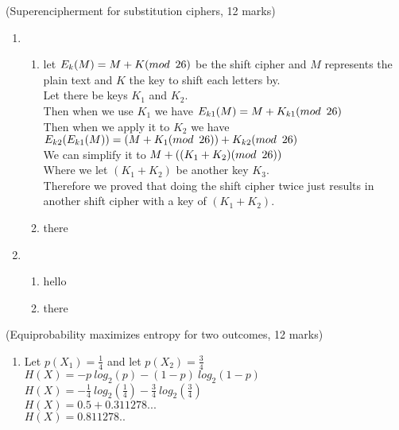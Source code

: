\documentclass{assignment}
\begin{document}
\begin{problemlist}
\pbitem (Superencipherment for substitution ciphers, 12 marks)
\begin{problem}
\begin{answer}
\begin{enumerate}[label=(\alph*)]
	\item	\begin{enumerate}[label=(\roman*)]
			\item let $ E_k(M) = M + K (mod \hspace{.5em} 26) $ be the shift cipher and $M$ represents the plain text 
				  and $K$ the key to shift each letters by. \\
				  Let there be keys $K_1$ and $K_2$. \\
				  Then when we use $K_1$ we have $E_{k1}(M) =  M + K_{k1} (mod \hspace{.5em} 26) $ \\
				  Then when we apply it to $K_2$ we have $E_{k2}(E_{k1}(M)) = (M + K_{1} (mod \hspace{.5em} 26)) + K_{k2} (mod \hspace{.5em} 26) $ \\
				  We can simplify it to $M + ((K_{1} + K_{2}) (mod \hspace{.5em} 26)) $ \\
				  Where we let $(K_1 + K_2)$ be another key $K_3$. \\
				  Therefore we proved that doing the shift cipher twice just results in another shift cipher with a key of $(K_1 + K_2)$. \\
			\item there
			\end{enumerate}
			
	\item 	\begin{enumerate}[label=(\roman*)]
			\item hello
			\item there
			\end{enumerate}
\end{enumerate}
\end{answer}
\end{problem}

\pbitem (Equiprobability maximizes entropy for two outcomes, 12 marks)
\begin{problem}
\begin{answer}
\begin{enumerate}[label=(\alph*)]
	\item	Let $ p(X_1) = \frac{1}{4} $ and let $ p(X_2) = \frac{3}{4} $	\\
			$H(X) = -p \ log_2(p) -(1-p) \ log_2(1-p) $ \\
			$H(X) = -\frac{1}{4} \ log_2(\frac{1}{4}) -\frac{3}{4} \ log_2(\frac{3}{4}) $ \\
			$H(X) = 0.5 + 0.311278...$ \\
			$H(X) = 0.811278.. $
			

\end{enumerate}
\end{answer}
\end{problem}
\end{problemlist}
\end{document}
